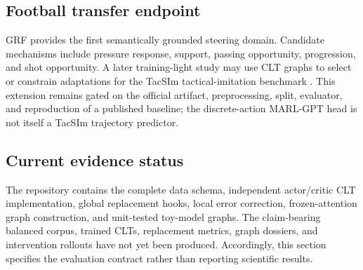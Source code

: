 \subsection{Football transfer endpoint}

GRF provides the first semantically grounded steering domain. Candidate mechanisms include pressure response, support, passing opportunity, progression, and shot opportunity. A later training-light study may use CLT graphs to select or constrain adaptations for the TacSIm tactical-imitation benchmark \cite{wen2026tacsim}. This extension remains gated on the official artifact, preprocessing, split, evaluator, and reproduction of a published baseline; the discrete-action MARL-GPT head is not itself a TacSIm trajectory predictor.

\subsection{Current evidence status}

The repository contains the complete data schema, independent actor/critic CLT implementation, global replacement hooks, local error correction, frozen-attention graph construction, and unit-tested toy-model graphs. The claim-bearing balanced corpus, trained CLTs, replacement metrics, graph dossiers, and intervention rollouts have not yet been produced. Accordingly, this section specifies the evaluation contract rather than reporting scientific results.
